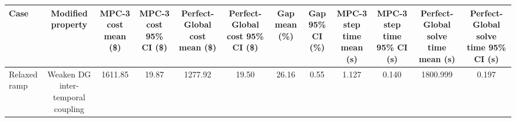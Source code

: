\begin{tabular}{lccccccccccc}
\toprule
Case & Modified property & MPC-3 cost mean (\$) & MPC-3 cost 95\% CI (\$) & Perfect-Global cost mean (\$) & Perfect-Global cost 95\% CI (\$) & Gap mean (\%) & Gap 95\% CI (\%) & MPC-3 step time mean (s) & MPC-3 step time 95\% CI (s) & Perfect-Global solve time mean (s) & Perfect-Global solve time 95\% CI (s) \\
\midrule
Relaxed ramp & Weaken DG inter-temporal coupling & 1611.85 & 19.87 & 1277.92 & 19.50 & 26.16 & 0.55 & 1.127 & 0.140 & 1800.999 & 0.197 \\
\bottomrule
\end{tabular}
